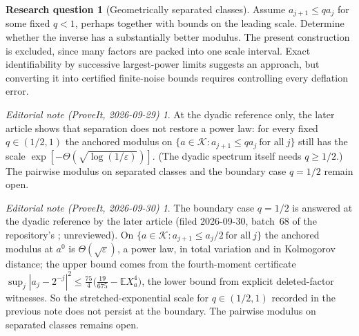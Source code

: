 \documentclass[11pt,a4paper]{article}
\theoremstyle{definition}
\newtheorem{question}{Research question}
\theoremstyle{remark}
\newtheorem*{ednote}{Editorial note (ProveIt, 2026-09-29)}
\newtheorem*{ednotelater}{Editorial note (ProveIt, 2026-09-30)}
\newcommand{\E}{\mathbb E}
\newcommand{\K}{\mathcal K}
\newcommand{\eps}{\varepsilon}
\begin{document}
\begin{question}[Geometrically separated classes]
Assume $a_{j+1}\le q a_j$ for some fixed $q<1$, perhaps together with
bounds on the leading scale. Determine whether the inverse has a
substantially better modulus. The present construction is excluded,
since many factors are packed into one scale interval. Exact
identifiability by successive largest-power limits suggests an approach,
but converting it into certified finite-noise bounds requires controlling
every deflation error.
\end{question}
\begin{ednote}
At the dyadic reference only, the later article
 shows that
separation does not restore a power law: for every fixed $q\in(1/2,1)$ the
anchored modulus on $\{a\in\K:a_{j+1}\le qa_j\ \text{for all}\ j\}$ still
has the scale $\exp[-\Theta(\sqrt{\log(1/\eps)})]$. (The dyadic spectrum
itself needs $q\ge1/2$.) The pairwise modulus on separated classes and the
boundary case $q=1/2$ remain open.
\end{ednote}
\begin{ednotelater}
The boundary case $q=1/2$ is answered at the dyadic reference by the later
article
(filed 2026-09-30, batch~68 of the repository's ;
unreviewed). On $\{a\in\K:a_{j+1}\le a_j/2\ \text{for all}\ j\}$ the
anchored modulus at $a^0$ is $\Theta(\sqrt\eps)$, a power law, in total
variation and in Kolmogorov distance; the upper bound comes from the
fourth-moment certificate
$\sup_j|a_j-2^{-j}|^2\le\tfrac{75}{4}\bigl(\tfrac{19}{675}-\E X_a^4\bigr)$,
the lower bound from explicit deleted-factor witnesses. So the
stretched-exponential scale for $q\in(1/2,1)$ recorded in the previous note
does not persist at the boundary. The pairwise modulus on separated classes
remains open.
\end{ednotelater}
\end{document}
